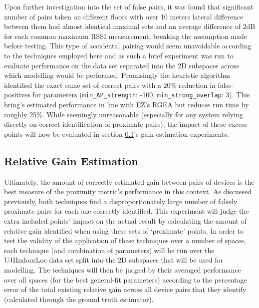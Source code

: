\documentclass{UoYCSproject}
\begin{document}
                Upon further investigation into the set of false pairs, it was found that significant number of pairs taken on different floors with over 10 meters lateral difference between them had almost identical maximal sets and an average difference of 2dB for each common maximum RSSI measurement, breaking the assumption made before testing. This type of accidental pairing would seem unavoidable according to the techniques employed here and as such a brief experiment was run to evaluate performance on the data set separated into the 2D subspaces across which modelling would be performed. Promisingly the heuristic algorithm identified the exact same set of correct pairs with a 20\% reduction in false-positives for parameters (\texttt{min\_AP\_strength}: -100, \texttt{min\_strong\_overlap}: 3). This bring's estimated performance in line with EZ's RGEA but reduces run time by roughly 25\%. While seemingly unreasonable (especially for any system relying directly on correct identification of proximate pairs), the impact of these excess points will now be evaluated in section \ref{sec:gainestimation}'s gain estimation experiments.
		    
		    \subsection{Relative Gain Estimation}
		    \label{sec:gainestimation}
            
                Ultimately, the amount of correctly estimated gain between pairs of devices is the best measure of the proximity metric's performance in this context. As discussed previously, both techniques find a disproportionately large number of falsely proximate pairs for each one correctly identified. This experiment will judge the extra included points' impact on the actual result by calculating the amount of relative gain identified when using these sets of `proximate' points. In order to test the validity of the application of these techniques over a number of spaces, each technique (and combination of parameters) will be run over the UJIIndoorLoc data set split into the 2D subspaces that will be used for modelling. The techniques will then be judged by their averaged performance over all spaces (for the best general-fit parameters) according to the percentage error of the total existing relative gain across all device pairs that they identify (calculated through the ground truth estimator).
                
\end{document}
